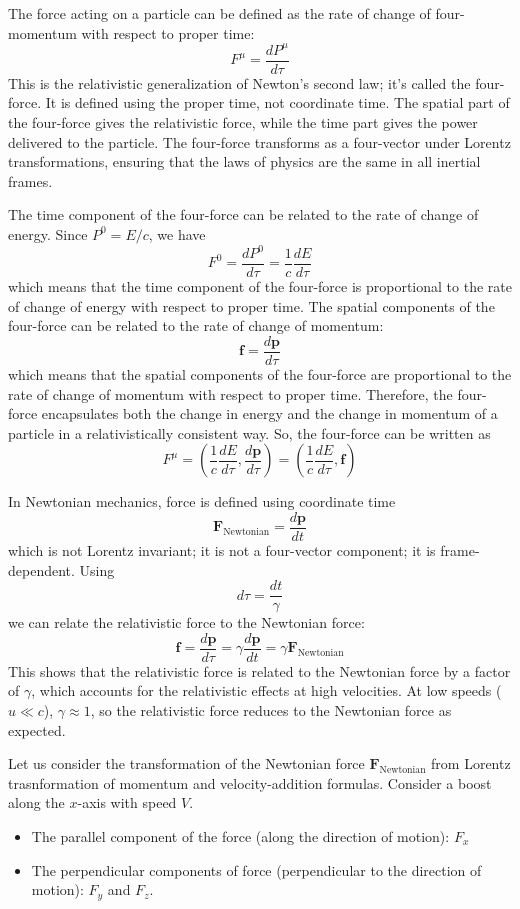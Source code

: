 \documentclass[12pt]{article}
\begin{document}
The force acting on a particle can be defined as the rate of change of four-momentum with respect to proper time:
\[F^\mu = \frac{dP^\mu}{d\tau}
\]
This is the relativistic generalization of Newton's second law; it's called the four-force. It is defined using the proper time, not coordinate time. The spatial part of the four-force gives the relativistic force, while the time part gives the power delivered to the particle. The four-force transforms as a four-vector under Lorentz transformations, ensuring that the laws of physics are the same in all inertial frames.

The time component of the four-force can be related to the rate of change of energy. Since $P^0 = E/c$, we have
\[
F^0 = \frac{dP^0}{d\tau} = \frac{1}{c}\frac{dE}{d\tau}
\]
which means that the time component of the four-force is proportional to the rate of change of energy with respect to proper time. The spatial components of the four-force can be related to the rate of change of momentum:
\[
\mathbf{f} = \frac{d\mathbf{p}}{d\tau}
\]
which means that the spatial components of the four-force are proportional to the rate of change of momentum with respect to proper time. Therefore, the four-force encapsulates both the change in energy and the change in momentum of a particle in a relativistically consistent way. So, the four-force can be written as
\[
F^\mu = \left(\frac{1}{c}\frac{dE}{d\tau}, \frac{d\mathbf{p}}{d\tau}\right) = \left(\frac{1}{c}\frac{dE}{d\tau}, \mathbf{f}\right)
\]

In Newtonian mechanics, force is defined using coordinate time 
\[
\mathbf{F}_\text{Newtonian} = \frac{d\mathbf{p}}{dt}\]
which is not Lorentz invariant; it is not a four-vector component; it is frame-dependent. Using
\[
d\tau = \frac{dt}{\gamma}
\]
we can relate the relativistic force to the Newtonian force:
\[
\mathbf{f} = \frac{d\mathbf{p}}{d\tau} = \gamma \frac{d\mathbf{p}}{dt} = \gamma \mathbf{F}_\text{Newtonian}
\]
This shows that the relativistic force is related to the Newtonian force by a factor of $\gamma$, which accounts for the relativistic effects at high velocities. At low speeds ($u \ll c$), $\gamma \approx 1$, so the relativistic force reduces to the Newtonian force as expected.

Let us consider the transformation of the Newtonian force $\mathbf{F}_\text{Newtonian}$ from Lorentz trasnformation of momentum and velocity-addition formulas. Consider a boost along the $x$-axis with speed $V$. 
\begin{itemize}
    \item The parallel component of the force (along the direction of motion): $F_x$
    \item The perpendicular components of force (perpendicular to the direction of motion): $F_y$ and $F_z$.
\end{itemize}
\end{document}
